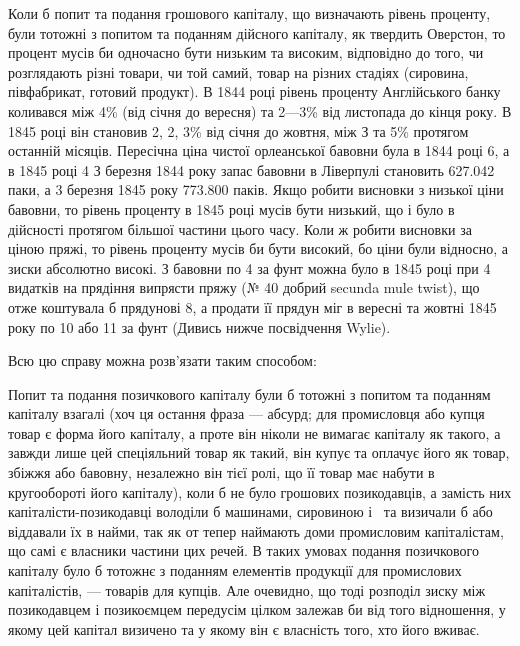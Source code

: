 Коли б попит та подання грошового капіталу, що визначають рівень
проценту, були тотожні з попитом та поданням дійсного капіталу, як твердить
Оверстон, то процент мусів би одночасно бути низьким та високим, відповідно до
того, чи розглядають різні товари, чи той самий, товар на різних стадіях (сировина,
півфабрикат, готовий продукт). В 1844 році рівень проценту Англійського банку
коливався між 4\% (від січня до вересня) та 2—3\% від листопада до
кінця року. В 1845 році він становив 2, 2, 3\% від січня до жовтня, між
З та 5\% протягом останній місяців. Пересічна ціна чистої орлеанської бавовни
була в 1844 році 6, а в 1845 році 4 З березня 1844 року
запас бавовни в Ліверпулі становить \num{627.042} паки, а 3 березня 1845 року
\num{773.800} паків. Якщо робити висновки з низької ціни бавовни, то рівень проценту
в 1845 році мусів бути низький, що і було в дійсності протягом більшої
частини цього часу. Коли ж робити висновки за ціною пряжі, то рівень проценту
мусів би бути високий, бо ціни були відносно, а зиски абсолютно високі.
З бавовни по 4 за фунт можна було в 1845 році при 4 видатків
на прядіння випрясти пряжу (№ 40 добрий secunda mule twist), що отже коштувала
б прядунові 8, а продати її прядун міг в вересні та жовтні 1845 року
по 10 або 11 за фунт (Дивись нижче посвідчення Wylie).

Всю цю справу можна розв’язати таким способом:

Попит та подання позичкового капіталу були б тотожні з попитом та поданням
капіталу взагалі (хоч ця остання фраза — абсурд; для промисловця або
купця товар є форма його капіталу, а проте він ніколи не вимагає капіталу як
такого, а завжди лише цей спеціяльний товар як такий, він купує та оплачує
його як товар, збіжжя або бавовну, незалежно він тієї ролі, що її товар має
набути в кругообороті його капіталу), коли б не було грошових позикодавців,
а замість них капіталісти-позикодавці володіли б машинами, сировиною і~ та
визичали б або віддавали їх в найми, так як от тепер наймають доми промисловим
капіталістам, що самі є власники частини цих речей. В таких умовах
подання позичкового капіталу було б тотожнє з поданням елементів продукції
для промислових капіталістів, — товарів для купців. Але очевидно, що тоді розподіл
зиску між позикодавцем і позикоємцем передусім цілком залежав би від
того відношення, у якому цей капітал визичено та у якому він є власність
того, хто його вживає.

